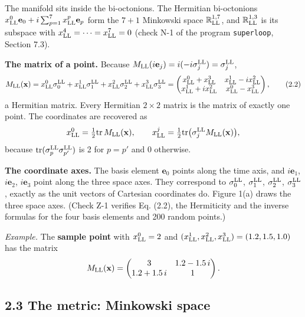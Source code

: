 \documentclass[
  10pt,
]{article}
\begin{document}
The manifold sits inside the bi-octonions. The Hermitian bi-octonions
\(x^0_{\rm LL}\mathbf e_0+i\sum_{p=1}^7x^p_{\rm LL}\mathbf e_p\) form
the \(7+1\) Minkowski space \(\mathbb R^{1,7}_{\rm LL}\), and
\(\mathbb R^{1,3}_{\rm LL}\) is its subspace with
\(x^4_{\rm LL}=\dots=x^7_{\rm LL}=0\) (check N-1 of the program
\texttt{superloop}, Section 7.3).

\textbf{The matrix of a point.} Because
\(M_{\rm LL}(i\mathbf e_j)=i(-i\sigma^{\rm LL}_j)=\sigma^{\rm LL}_j\),
\[M_{\rm LL}(\mathbf x)=x^0_{\rm LL}\sigma^{\rm LL}_0+x^1_{\rm LL}\sigma^{\rm LL}_1+x^2_{\rm LL}\sigma^{\rm LL}_2+x^3_{\rm LL}\sigma^{\rm LL}_3=\begin{pmatrix}x^0_{\rm LL}+x^3_{\rm LL}&x^1_{\rm LL}-ix^2_{\rm LL}\\x^1_{\rm LL}+ix^2_{\rm LL}&x^0_{\rm LL}-x^3_{\rm LL}\end{pmatrix}, \tag{2.2}\]
a Hermitian matrix. Every Hermitian \(2\times2\) matrix is the matrix of
exactly one point. The coordinates are recovered as
\[x^0_{\rm LL}=\tfrac12\mathrm{tr}\,M_{\rm LL}(\mathbf x),\qquad x^j_{\rm LL}=\tfrac12\mathrm{tr}\big(\sigma^{\rm LL}_jM_{\rm LL}(\mathbf x)\big),\]
because \(\mathrm{tr}(\sigma^{\rm LL}_p\sigma^{\rm LL}_{p'})\) is 2 for
\(p=p'\) and 0 otherwise.

\textbf{The coordinate axes.} The basis element \(\mathbf e_0\) points
along the time axis, and \(i\mathbf e_1\), \(i\mathbf e_2\),
\(i\mathbf e_3\) point along the three space axes. They correspond to
\(\sigma^{\rm LL}_0\), \(\sigma^{\rm LL}_1\), \(\sigma^{\rm LL}_2\),
\(\sigma^{\rm LL}_3\), exactly as the unit vectors of Cartesian
coordinates do. Figure 1(a) draws the three space axes. (Check Z-1
verifies Eq. (2.2), the Hermiticity and the inverse formulas for the
four basis elements and 200 random points.)

\emph{Example.} The \textbf{sample point} with \(x^0_{\rm LL}=2\) and
\((x^1_{\rm LL},x^2_{\rm LL},x^3_{\rm LL})=(1.2,1.5,1.0)\) has the
matrix
\[M_{\rm LL}(\mathbf x)=\begin{pmatrix}3&1.2-1.5\,i\\1.2+1.5\,i&1\end{pmatrix}.\]

\hypertarget{the-metric-minkowski-space}{%
\subsection{2.3 The metric: Minkowski
space}\label{the-metric-minkowski-space}}
\end{document}
